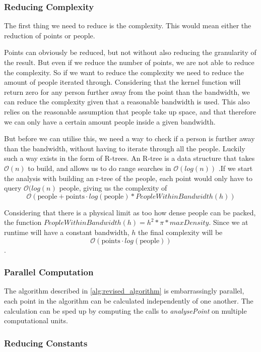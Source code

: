 \subsubsection{Reducing Complexity}

The first thing we need to reduce is the complexity. This would mean either the reduction of points or people.

Points can obviously be reduced, but not without also reducing the granularity of the result. But even if we reduce the number of points, we are not able to reduce the complexity. So if we want to reduce the complexity we need to reduce the amount of people iterated through. Considering that the kernel function will return zero for any person further away from the point than the bandwidth, we can reduce the complexity given that a reasonable bandwidth is used. This also relies on the reasonable assumption that people take up space, and that therefore we can only have a certain amount people inside a given bandwidth.

But before we can utilise this, we need a way to check if a person is further away than the bandwidth, without having to iterate through all the people. Luckily such a way exists in the form of R-trees. An R-tree is a data structure that takes $\mathcal{O}(n)$ to build, and allows us to do range searches in $\mathcal{O}(log(n))$ \cite{rtree}.If we start the analysis with building an r-tree of the people, each point would only have to query $\mathcal{O}(log(n)$ people, giving us the complexity of $$\mathcal{O}(\text{people} + \text{points} \cdot log(\text{people}) * PeopleWithinBandwidth(h))$$

Considering that there is a physical limit as too how dense people can be packed, the function $PeopleWithinBandwidth(h) = h^2 * \pi * maxDensity$. Since we at runtime will have a constant bandwidth, $h$ the final complexity will be $$\mathcal{O}(\text{points} \cdot log(\text{people}))$$.

\subsubsection{Parallel Computation}
The algorithm described in \cref{alg:revised_algorithm} is embarrassingly parallel, each point in the algorithm can be calculated independently of one another. The calculation can be sped up by computing the calls to \emph{analysePoint} on multiple computational units.

\subsubsection{Reducing Constants}


